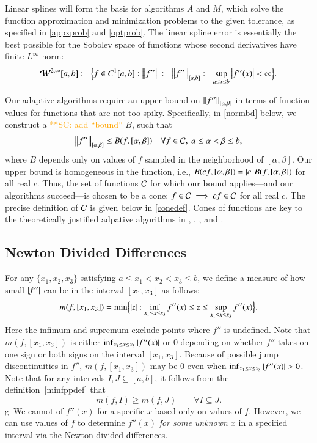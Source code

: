 \documentclass[review]{elsarticle}
\newcommand{\scnote}[1]{ {\textcolor{orange}  {\mbox{**SC:} #1}}}
\begin{document}
Linear splines will form the basis for algorithms $A$ and $M$, which solve the
function approximation and minimization problems to the given tolerance, as
specified in \eqref{appxprob} and \eqref{optprob}. The linear spline error is
essentially the best possible for the Sobolev space of functions whose second
derivatives have finite $L^{\infty}$-norm:
\[
\cw^{2,\infty}[a,b] : = \Bigl \{f \in C^1[a,b] : \norm{f''} : = \norm[{[a,b]}]{f''} : = \sup_{a \le x \le b} \abs{f''(x)} <  \infty \Bigr\}.
\]

Our adaptive algorithms require an upper bound on $\norm[{[\alpha,
\beta]}]{f''}$ in terms of function values for functions that are not too spiky.
Specifically, in \eqref{normbd} below, we construct a \scnote{add ``bound''} $B$, such that
\[
\norm[{[\alpha, \beta]}]{f''} \le B(f,[\alpha,\beta]) \quad \forall f \in \cc, \ a \le \alpha < \beta \le b,
\]
where $B$ depends only on values of $f$ sampled in the neighborhood of $[\alpha,
\beta]$. Our upper bound is homogeneous in the function, i.e.,
$B(cf,[\alpha,\beta]) = \abs{c} B(f,[\alpha,\beta])$ for all real $c$. Thus, the
set of functions $\cc$ for which our bound applies---and our algorithms
succeed---is chosen to be a cone: $f \in \cc \implies cf \in \cc$ for all real
$c$. The precise definition of $\cc$ is given below in \eqref{conedef}. Cones of
functions are key to the theoretically justified adpative algorithms in
\cite{HicEtal14b}, \cite{Ton14a}, \cite{Din15a}, and \cite{HicRazYun15a}.

\subsection{Newton Divided Differences} \label{sec:ndd}

For any $\{x_1, x_2, x_3\}$ satisfying $a \le x_1 < x_2 < x_3 \le b$, we define a
measure of how small $\abs{f''}$ can be in the interval $[x_1, x_3]$ as follows:
\begin{equation} \label{minfppdef}
m(f,[x_1, x_3]) = \min \Bigl\{ \abs{z}  : \inf_{x_1 \le x \le x_3} f''(x) \le z \le \sup_{x_1 \le x \le x_3} f''(x) \Bigr\}.
\end{equation}
Here the infimum and supremum exclude points where $f''$ is undefined. Note that
$m(f,[x_1, x_3])$ is either $ \inf_{x_1 \le x \le x_3} \abs{f''(x)}$ or $0$
depending on whether $f''$ takes on one sign or both signs on the interval
$[x_1, x_3]$. Because of possible jump discontinuities in $f''$, $m(f,[x_1,
x_3])$ may be $0$ even when $\inf_{x_1 \le x \le x_3} \abs{f''(x)} > 0$. Note
that for any intervals $I , J \subseteq [a,b]$, it follows from the definition~\eqref{minfppdef}
that
\begin{equation} \label{mdec}
m(f,I) \ge m(f,J) \qquad \forall I \subseteq J.
\end{equation}
 g\
We cannot of $f''(x)$ for a specific $x$ based only on values of $f$. However,
we can use values of $f$ to determine $f''(x)$ \emph{for some unknown $x$} in a
specified interval via the Newton divided differences.
\end{document}
